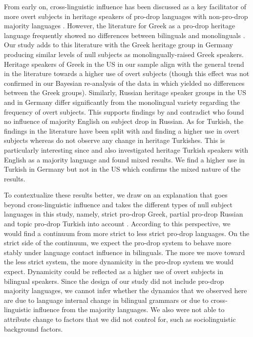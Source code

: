 \documentclass[output=paper,colorlinks,citecolor=brown]{langscibook}
\begin{document}
From early on, cross-linguistic influence has been discussed as a key facilitator of more overt subjects in heritage speakers of pro-drop languages with non-pro-drop majority languages \parencite{gawlitzek1996bilingual, dopke2000generation}. However, the literature for Greek as a pro-drop heritage language frequently showed no differences between bilinguals and monolinguals \parencite{di2019age, DaskalakiEtAl2019, andreou2020effects, torregrossa2021bilingual, giannakou2022journal}. Our study adds to this literature with the Greek heritage group in Germany producing similar levels of null subjects as monolingually-raised Greek speakers. Heritage speakers of Greek in the US in our sample align with the general trend in the literature towards a higher use of overt subjects (though this effect was not confirmed in our Bayesian re-analysis of the data in \textcite{ozsoyetal} which yielded no differences between the Greek groups). Similarly, Russian heritage speaker groups in the US and in Germany differ significantly from the monolingual variety regarding the frequency of overt subjects. This supports findings by \textcite{isurin2011russian, DubininaPolinsky2013} and contradict \textcite{nagy2011null} who found no influence of majority English on subject drop in Russian. As for Turkish, the findings in the literature have been split with \textcite{Haznedar2010} and \textcite{Koc2016} finding a higher use in overt subjects whereas \textcite{AzarEtAl2020, dikilitacsacquisition} do not observe any change in heritage Turkishes. This is particularly interesting since \textcite{Haznedar2010, Koc2016} and \textcite{dikilitacsacquisition} also investigated heritage Turkish speakers with English as a majority language and found mixed results. We find a higher use in Turkish in Germany but not in the US which confirms the mixed nature of the results. 

To contextualize these results better, we draw on an explanation that goes beyond cross-linguistic influence and takes the different types of null subject languages in this study, namely, strict pro-drop Greek, partial pro-drop Russian and topic pro-drop Turkish into account \parencite{philippaki-warburton_1987, Oeztuerk2008, Shushurin2018}. According to this perspective, we would find a continuum from more strict to less strict pro-drop languages. On the strict side of the continuum, we expect the pro-drop system to behave more stably under language contact influence in bilinguals. The more we move toward the less strict system, the more dynamicity in the pro-drop system we would expect. Dynamicity could be reflected as a higher use of overt subjects in bilingual speakers. Since the design of our study did not include pro-drop majority languages, we cannot infer whether the dynamics that we observed here are due to language internal change in bilingual grammars or due to cross-linguistic influence from the majority languages. We also were not able to attribute change to factors that we did not control for, such as sociolinguistic background factors.
 
\end{document}
